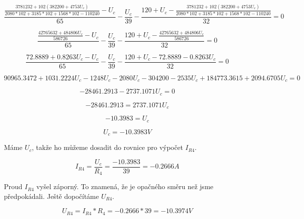 \documentclass[a4paper, 12pt]{article}
\begin{document}
$$ \frac{ \frac{ 3781232 + 102(382200+4753U_c) }{ 2080*102+3185*102+1568*102-110240 }-U_c }{65} - \frac{U_c}{39} - \frac{120 + U_c - \frac{ 3781232 + 102(382200+4753U_c) }{ 2080*102+3185*102+1568*102-110240 }}{32} = 0 $$

$$ \frac{ \frac{42765632 + 484806U_c}{586726} - U_c}{65} - \frac{U_c}{39} - \frac{120 + U_c - \frac{42765632 + 484806U_c}{586726} }{32} = 0 $$

$$ \frac{72.8889+0.8263U_c - U_c}{65} - \frac{U_c}{39} - \frac{120 + U_c -72.8889 - 0.8263U_c}{32} = 0 $$

$$ 90965.3472+1031.2224U_c-1248U_c-2080U_c-304200-2535U_c+184773.3615+2094.6705U_c = 0 $$

$$ -28461.2913 - 2737.1071U_c = 0 $$

$$ -28461.2913 = 2737.1071U_c $$

$$ -10.3983 = U_c $$

$$ U_c = -10.3983 V $$

Máme $U_c$, takže ho můžeme dosadit do rovnice pro výpočet $I_{R4}$.

$$ I_{R4} = \frac{U_c}{R_4} = \frac{-10.3983}{39} = -0.2666A $$

Proud $I_{R4}$ vyšel záporný. To znamená, že je opačného směru než jsme předpokádali. Ještě dopočítáme $U_{R4}$.

$$ U_{R4} = I_{R4} * R_4 = -0.2666 * 39 = -10.3974 V $$



\newpage
\end{document}
